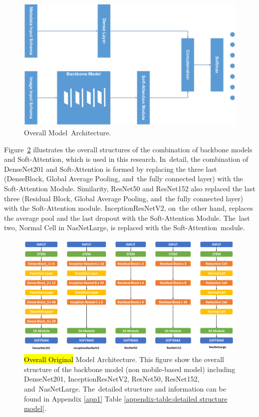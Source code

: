 \documentclass[sensors,article,accept,pdftex,moreauthors]{Definitions/mdpi}
\begin{document}
\begin{figure}[H]
	\includegraphics[width=0.8\linewidth]{Definitions/MainModel - Model Form}
	\caption{Overall Model~Architecture.}
	\label{fig:main-model}
\end{figure}

Figure~\ref{fig:model-structure} illustrates the overall structures of the combination of backbone models and Soft-Attention, which is used in this research. In~detail, the combination of DenseNet201 and Soft-Attention is formed by replacing the three last (DenseBlock, Global Average Pooling, and~the fully connected layer) with the Soft-Attention Module. Similarity, ResNet50 and ResNet152 also replaced the last three (Residual Block, Global Average Pooling, and~the fully connected layer) with the Soft-Attention module. InceptionResNetV2, on~the other hand, replaces the average pool and the last dropout with the Soft-Attention Module. The~last two, Normal Cell in NasNetLarge, is replaced with the Soft-Attention~module. 

\begin{figure}[H]
	\includegraphics[width=0.8\linewidth]{Definitions/Model Structure}
	\caption{\hl{Overall Original} %
 Model Architecture. This figure show the overall structure of the backbone model (non mobile-based model) including DenseNet201, InceptionResNetV2, ResNet50, ResNet152, and~NasNetLarge. The~detailed structure and information can be found in Appendix \ref{app1} Table \ref{appendix-table:detailed structure model}.}
	\label{fig:model-structure}
\end{figure}
\end{document}
